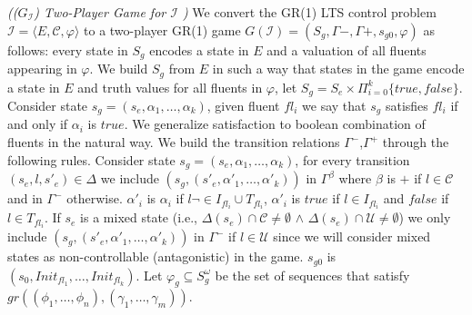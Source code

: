 %

\begin{definition}\label{def:lts-2-game}\emph{(($G_{\mathcal{I}}$) Two-Player Game for $\mathcal{I}$ )}
	We convert the GR(1) LTS control problem $\mathcal{I}=\langle E, \mathcal{C}, \varphi \rangle$ to a two-player GR(1) game $G (\mathcal{I})=(S_{g},\Gamma{-},\Gamma{+},s_{g0},\varphi)$ as follows: every state in $S_{g}$ encodes a state in $E$ and a valuation of all fluents
	appearing in $\varphi$. We build $S_g$ from $E$ in such a way that states in the game encode a state in $E$ and truth values for all fluents in $\varphi$, let $S_g = S_e \times \Pi_{i=0}^{k}\{true,false\}$.  Consider state $s_g=(s_e,\alpha_1,\ldots,\alpha_k)$, given fluent $fl_i$ we say that $s_g$ satisfies $fl_i$ if and only if $\alpha_i$ is $true$. We generalize satisfaction to boolean combination of fluents in the natural way.  We build the transition relations $\Gamma^{-}$,$\Gamma^{+}$ through the following rules.  Consider state $s_g=(s_e,\alpha_1,\ldots,\alpha_k)$, for every transition $(s_e,l,s'_e) \in \Delta$ we include $(s_g,(s'_e,\alpha'_1,\ldots,\alpha'_k))$ in $\Gamma^{\beta}$ where
	$\beta$ is $+$ if $l \in \mathcal{C}$ and in $\Gamma^{-}$ otherwise.
	$\alpha'_i$ is $\alpha_i$ if $l \neg\in I_{fl_i} \cup T_{fl_i}$, $\alpha'_i$ is $true$ if $l \in I_{fl_i}$ and $false$ if $l \in T_{fl_i}$.  
	If $s_e$ is a mixed state (i.e., $\Delta(s_e) \cap \mathcal{C} \neq \emptyset$
	$\wedge$
	$\Delta(s_e) \cap \mathcal{U} \neq \emptyset$) we only include
	$(s_g, (s'_e,\alpha'_1,\ldots,\alpha'_k))$ in $\Gamma^{-}$
	if $l \in \mathcal{U}$ since we will consider mixed states as 
	non-controllable (antagonistic) in the game.
	$s_{g0}$ is $(s_0, Init_{fl_1},\ldots, Init_{fl_k})$.
	Let $\varphi_g \subseteq S_g^{\omega}$ be the set of sequences that satisfy $gr((\phi_1,\ldots,\phi_n),(\gamma_1,\ldots,\gamma_m))$.
\end{definition}

